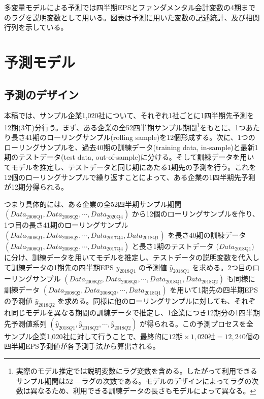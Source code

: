 \documentclass[a4paper, 12pt]{jsreport}
\begin{document}
多変量モデルによる予測では四半期EPSとファンダメンタル会計変数の4期までのラグを説明変数として用いる。図表は予測に用いた変数の記述統計、及び相関行列を示している。


\chapter{予測モデル}

\section{予測のデザイン}

本稿では、サンプル企業1,020社について、それぞれ1社ごとに1四半期先予測を12期(3年)分行う。まず、ある企業の全52四半期サンプル期間\footnote{実際のモデル推定では説明変数にラグ変数を含める。したがって利用できるサンプル期間は$52 - ラグの次数 $である。モデルのデザインによってラグの次数は異なるため、利用できる訓練データの長さもモデルによって異なる。}をもとに、1つあたり長さ41期のローリングサンプル(rolling sample)を12個形成する。次に、1つのローリングサンプルを、過去40期の訓練データ(training data, in-sample)と最新1期のテストデータ(test data, out-of-sample)に分ける。そして訓練データを用いてモデルを推定し、テストデータと同じ期にあたる1期先の予測を行う。これを12個のローリングサンプルで繰り返すことによって、ある企業の1四半期先予測が12期分得られる。


つまり具体的には、ある企業の全52四半期サンプル期間 $(Data_{\text{2008Q1}}, Data_{\text{2008Q2}}, \cdots, Data_{\text{2020Q4}})$ から12個のローリングサンプルを作り、1つ目の長さ41期のローリングサンプル $(Data_{\text{2008Q1}}, Data_{\text{2008Q2}}, \cdots, Data_{\text{2017Q4}}, Data_{\text{2018Q1}})$ を長さ40期の訓練データ $(Data_{\text{2008Q1}}, Data_{\text{2008Q2}}, \cdots, Data_{\text{2017Q4}})$ と長さ1期のテストデータ ($Data_{\text{2018Q1}})$ に分け、訓練データを用いてモデルを推定し、テストデータの説明変数を代入して訓練データの1期先の四半期EPS $y_{2018Q1}$ の予測値 $\hat{y}_{2018Q1}$ を求める。2つ目のローリングサンプル $(Data_{\text{2008Q2}}, Data_{\text{2008Q3}}, \cdots, Data_{\text{2018Q1}}, Data_{\text{2018Q2}})$ も同様に 訓練データ $(Data_{\text{2008Q2}}, Data_{\text{2008Q3}}, \cdots, Data_{\text{2018Q1}})$ を用いて1期先の四半期EPSの予測値 $\hat{y}_{2018Q2}$ を求める。同様に他のローリングサンプルに対しても、それぞれ同じモデルを異なる期間の訓練データで推定し、1企業につき12期分の1四半期先予測値系列 $(\hat{y}_{2018Q1}, \hat{y}_{2018Q2}, \cdots, \hat{y}_{2018Q2})$ が得られる。この予測プロセスを全サンプル企業1,020社に対して行うことで、最終的に$12期 \times 1,020社 = 12,240個$の四半期EPS予測値が各予測手法から算出される。
\end{document}
